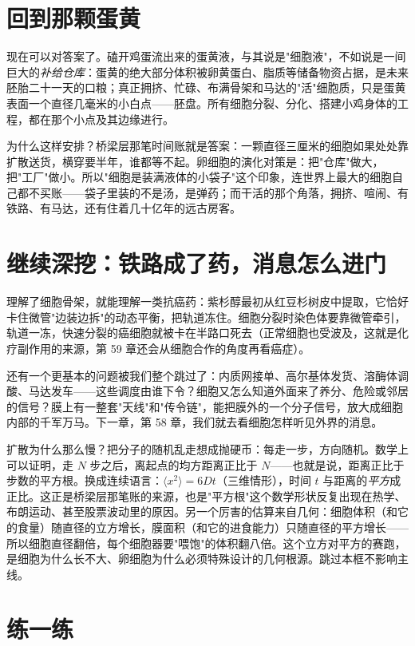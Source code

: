 \section{回到那颗蛋黄}

现在可以对答案了。磕开鸡蛋流出来的蛋黄液，与其说是"细胞液"，不如说是一间巨大的\emph{补给仓库}：蛋黄的绝大部分体积被卵黄蛋白、脂质等储备物资占据，是未来胚胎二十一天的口粮；真正拥挤、忙碌、布满骨架和马达的"活"细胞质，只是蛋黄表面一个直径几毫米的小白点——胚盘。所有细胞分裂、分化、搭建小鸡身体的工程，都在那个小点及其边缘进行。

为什么这样安排？桥梁层那笔时间账就是答案：一颗直径三厘米的细胞如果处处靠扩散送货，横穿要半年，谁都等不起。卵细胞的演化对策是：把"仓库"做大，把"工厂"做小。所以"细胞是装满液体的小袋子"这个印象，连世界上最大的细胞自己都不买账——袋子里装的不是汤，是弹药；而干活的那个角落，拥挤、喧闹、有铁路、有马达，还有住着几十亿年的远古房客。

\section{继续深挖：铁路成了药，消息怎么进门}

理解了细胞骨架，就能理解一类抗癌药：紫杉醇最初从红豆杉树皮中提取，它恰好卡住微管"边装边拆"的动态平衡，把轨道冻住。细胞分裂时染色体要靠微管牵引，轨道一冻，快速分裂的癌细胞就被卡在半路口死去（正常细胞也受波及，这就是化疗副作用的来源，第 59 章还会从细胞合作的角度再看癌症）。

还有一个更基本的问题被我们整个跳过了：内质网接单、高尔基体发货、溶酶体调酸、马达发车——这些调度由谁下令？细胞又怎么知道外面来了养分、危险或邻居的信号？膜上有一整套"天线"和"传令链"，能把膜外的一个分子信号，放大成细胞内部的千军万马。下一章，第 58 章，我们就去看细胞怎样听见外界的消息。

\begin{tiaozhan}
扩散为什么那么慢？把分子的随机乱走想成抛硬币：每走一步，方向随机。数学上可以证明，走 $N$ 步之后，离起点的均方距离正比于 $N$——也就是说，距离正比于步数的平方根。换成连续语言：$\langle x^2\rangle = 6Dt$（三维情形），时间 $t$ 与距离的\emph{平方}成正比。这正是桥梁层那笔账的来源，也是"平方根"这个数学形状反复出现在热学、布朗运动、甚至股票波动里的原因。另一个厉害的估算来自几何：细胞体积（和它的食量）随直径的立方增长，膜面积（和它的进食能力）只随直径的平方增长——所以细胞直径翻倍，每个细胞器要"喂饱"的体积翻八倍。这个立方对平方的赛跑，是细胞为什么长不大、卵细胞为什么必须特殊设计的几何根源。跳过本框不影响主线。
\end{tiaozhan}

\section*{练一练}

